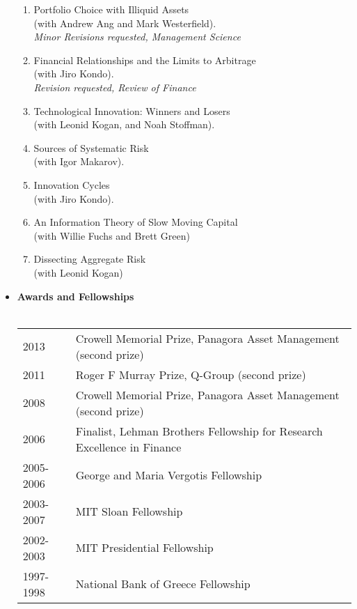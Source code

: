 \documentclass[11pt,a4paper,sans]{moderncv}
\begin{document}
\begin{resume}
\begin{itemize}
\begin{enumerate}
\item Portfolio Choice with Illiquid Assets\\ (with Andrew Ang and Mark Westerfield).\\
\emph{Minor Revisions requested, Management Science}

\item Financial Relationships and the Limits to Arbitrage\\ (with Jiro Kondo).\\
\emph{Revision requested, Review of Finance}

\item Technological Innovation: Winners and Losers\\ (with Leonid Kogan, and Noah Stoffman).
\item Sources of Systematic Risk\\ (with Igor Makarov).
\item Innovation Cycles\\ (with Jiro Kondo).
\item An Information Theory of Slow Moving Capital\\ (with Willie Fuchs and Brett Green)
\item Dissecting Aggregate Risk\\ (with Leonid Kogan)
\end{enumerate}

\vspace{0.5cm}

\item \textbf{Awards and Fellowships}\\ \\
\begin{tabular}{ll}
2013 & Crowell Memorial Prize, Panagora Asset Management (second prize)\\
2011 & Roger F Murray Prize, Q-Group (second prize)\\
2008 & Crowell Memorial Prize, Panagora Asset Management (second prize)\\
2006  & Finalist, Lehman Brothers Fellowship for Research Excellence in Finance\\
2005-2006 & George and Maria Vergotis Fellowship\\
2003-2007 & MIT Sloan Fellowship\\
2002-2003 & MIT Presidential Fellowship\\
1997-1998 & National Bank of Greece Fellowship \\
\end{tabular}


\end{itemize}
\end{resume}
\end{document}
